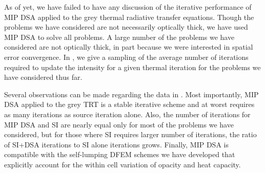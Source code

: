 As of yet, we have failed to have any discussion of the iterative performance of MIP DSA applied to the grey thermal radiative transfer equations.
Though the problems we have considered are not necessarily optically thick, we have used MIP DSA to solve all problems.
A large number of the problems we have considered are not optically thick, in part because we were interested in spatial error convergence.
In , we give a sampling of the average number of iterations required to update the intensity for a given thermal iteration for the problems we have considered thus far.

Several observations can be made regarding the data in .  
Most importantly, MIP DSA applied to the grey TRT is a stable iterative scheme and at worst requires as many iterations as source iteration alone.
Also, the number of iterations for MIP DSA and SI are nearly equal only for most of the problems we have considered, but for those where SI requires larger number of iterations, the ratio of SI+DSA iterations to SI alone iterations grows.
Finally, MIP DSA is compatible with the self-lumping DFEM schemes we have developed that explicitly account for the within cell variation of opacity and heat capacity.

